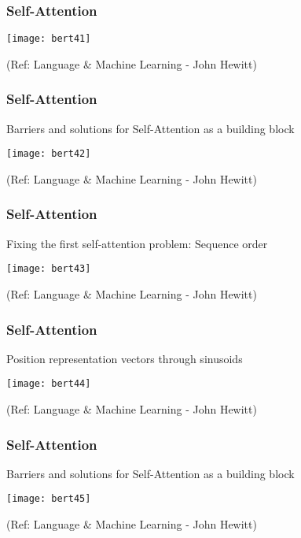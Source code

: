 \begin{frame}[fragile]\frametitle{Self-Attention}


\begin{center}
\texttt{[image: bert41]}
\end{center}	

 
{\tiny (Ref: Language \& Machine Learning - John Hewitt)}
\end{frame}

\begin{frame}[fragile]\frametitle{Self-Attention}

Barriers and solutions for Self-Attention as a building block

\begin{center}
\texttt{[image: bert42]}
\end{center}	

 
{\tiny (Ref: Language \& Machine Learning - John Hewitt)}
\end{frame}

\begin{frame}[fragile]\frametitle{Self-Attention}

Fixing the first self-attention problem: Sequence order

\begin{center}
\texttt{[image: bert43]}
\end{center}	

 
{\tiny (Ref: Language \& Machine Learning - John Hewitt)}
\end{frame}

\begin{frame}[fragile]\frametitle{Self-Attention}

Position representation vectors through sinusoids

\begin{center}
\texttt{[image: bert44]}
\end{center}	

 
{\tiny (Ref: Language \& Machine Learning - John Hewitt)}
\end{frame}

\begin{frame}[fragile]\frametitle{Self-Attention}

Barriers and solutions for Self-Attention as a building block

\begin{center}
\texttt{[image: bert45]}
\end{center}	

 
{\tiny (Ref: Language \& Machine Learning - John Hewitt)}
\end{frame}


